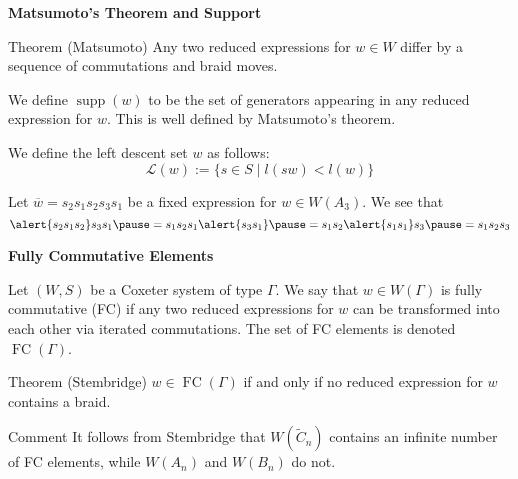 \documentclass[9pt,handout]{beamer}
\newcommand{\w}{\overline{w}}
\DeclareMathOperator{\FC}{FC}
\newcommand{\C}{\widetilde{C}}
\DeclareMathOperator{\supp}{supp}
\begin{document}

\begin{frame}{\textbf{Matsumoto's Theorem and Support}}
\begin{block}{Theorem (Matsumoto)}
Any two reduced expressions for $w\in W$ differ by a sequence of commutations and braid moves.
\end{block}	

\pause

\begin{definition}
	We define $\supp(w)$ to be the set of generators appearing in any reduced expression for $w$. This is well defined by Matsumoto's theorem.
\end{definition}

\begin{definition}
 We define the \alert{left descent set} $w$ as follows:
\[\mathcal{L}(w):=\{s \in S \mid l(sw) < l(w)\}\]
\end{definition}


\pause

\begin{example}
Let $\w=s_2s_1s_2s_3s_1$ be a fixed expression for $w \in W(A_3)$. We see that
\[\alert{s_2s_1s_2}s_3s_1 \pause =s_1s_2s_1\alert{s_3s_1} \pause =s_1s_2\alert{s_1s_1}s_3\pause=s_1s_2s_3\]	
\end{example}

\end{frame}


\begin{frame}{\textbf{Fully Commutative Elements}}
\begin{definition}
Let $(W,S)$ be a Coxeter system of type $\Gamma$. We say that $w \in W(\Gamma)$ is \alert{fully commutative} (\alert{FC}) if any two reduced expressions for $w$ can be transformed into each other via iterated commutations. The set of FC elements is denoted $\FC(\Gamma)$.	
\end{definition}

\begin{block}{Theorem (Stembridge)}
$w \in \FC(\Gamma)$ if and only if no reduced expression for $w$ contains a braid.
\end{block}

\begin{block}{Comment}
	It follows from Stembridge that $W(\C_n)$ contains an infinite number of FC elements, while $W(A_n)$ and $W(B_n)$ do not. 
\end{block}

\end{frame}
\end{document}
